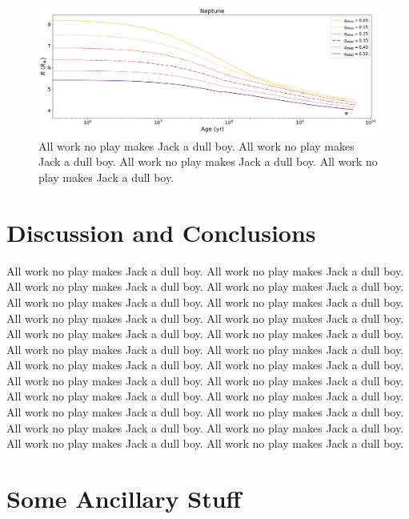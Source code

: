 \documentclass[11pt]{ucscthesisbs}
\begin{document}
\begin{figure}[ht]
 \centerline{
  \includegraphics[scale=0.45]{figures/n_cooling_radius_nz_4096_logx.png}
 }
\caption[Inhibition of convection on Uranus]
{All work no play makes Jack a dull boy. All work no play makes Jack a dull boy. All work no play makes Jack a dull boy. All work no play makes Jack a dull boy.  }
\label{fig:evolve_neptune_radius}
\end{figure}



\chapter{Discussion and Conclusions}
All work no play makes Jack a dull boy. All work no play makes Jack a dull boy. All work no play makes Jack a dull boy. All work no play makes Jack a dull boy. All work no play makes Jack a dull boy. All work no play makes Jack a dull boy. All work no play makes Jack a dull boy. All work no play makes Jack a dull boy. All work no play makes Jack a dull boy. All work no play makes Jack a dull boy. All work no play makes Jack a dull boy. All work no play makes Jack a dull boy. All work no play makes Jack a dull boy. All work no play makes Jack a dull boy. All work no play makes Jack a dull boy. All work no play makes Jack a dull boy. All work no play makes Jack a dull boy. All work no play makes Jack a dull boy. All work no play makes Jack a dull boy. All work no play makes Jack a dull boy. All work no play makes Jack a dull boy. All work no play makes Jack a dull boy. All work no play makes Jack a dull boy. All work no play makes Jack a dull boy. 




\appendix
\chapter{Some Ancillary Stuff}

\newcommand{\newblock}{}

\end{document}

